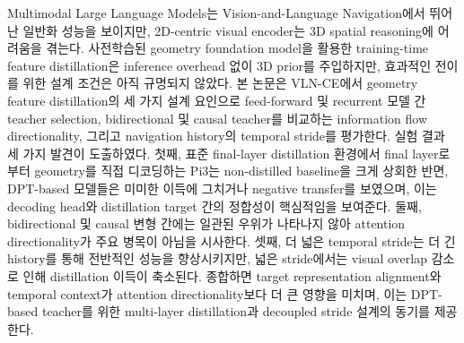 Multimodal Large Language Models는 Vision-and-Language Navigation에서 뛰어난 일반화 성능을 보이지만,
2D-centric visual encoder는 3D spatial reasoning에 어려움을 겪는다.
사전학습된 geometry foundation model을 활용한 training-time feature distillation은
inference overhead 없이 3D prior를 주입하지만, 효과적인 전이를 위한 설계 조건은 아직 규명되지 않았다.
본 논문은 VLN-CE에서 geometry feature distillation의 세 가지 설계 요인으로 feed-forward 및
recurrent 모델 간 teacher selection, bidirectional 및 causal teacher를 비교하는
information flow directionality, 그리고 navigation history의 temporal stride를 평가한다.
실험 결과 세 가지 발견이 도출하였다. 첫째, 표준 final-layer distillation 환경에서 final layer로부터
geometry를 직접 디코딩하는 Pi3는 non-distilled baseline을 크게 상회한 반면, DPT-based 모델들은
미미한 이득에 그치거나 negative transfer를 보였으며, 이는 decoding head와 distillation target 간의 정합성이
핵심적임을 보여준다. 둘째, bidirectional 및 causal 변형 간에는 일관된 우위가 나타나지 않아 attention directionality가
주요 병목이 아님을 시사한다. 셋째, 더 넓은 temporal stride는 더 긴 history를 통해 전반적인 성능을 향상시키지만,
넓은 stride에서는 visual overlap 감소로 인해 distillation 이득이 축소된다.
종합하면 target representation alignment와 temporal context가 attention directionality보다
더 큰 영향을 미치며, 이는 DPT-based teacher를 위한 multi-layer distillation과 decoupled stride 설계의 동기를 제공한다.

